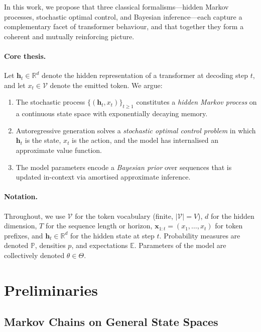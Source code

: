 \documentclass[11pt,a4paper]{article}
\theoremstyle{plain}
\theoremstyle{definition}
\theoremstyle{remark}
\newcommand{\R}{\mathbb{R}}
\newcommand{\E}{\mathbb{E}}
\newcommand{\Prob}{\mathbb{P}}
\newcommand{\vocab}{\mathcal{V}}
\begin{document}
In this work, we propose that three classical formalisms---hidden Markov
processes, stochastic optimal control, and Bayesian inference---each capture a
complementary facet of transformer behaviour, and that together they form a
coherent and mutually reinforcing picture.

\paragraph{Core thesis.}
Let $\bm{h}_t \in \R^d$ denote the hidden representation of a transformer at
decoding step $t$, and let $x_t \in \vocab$ denote the emitted token. We argue:
\begin{enumerate}[label=(\roman*)]
  \item The stochastic process $\{(\bm{h}_t, x_t)\}_{t \geq 1}$ constitutes a
        \emph{hidden Markov process} on a continuous state space with
        exponentially decaying memory.
  \item Autoregressive generation solves a \emph{stochastic optimal control
        problem} in which $\bm{h}_t$ is the state, $x_t$ is the action, and the
        model has internalised an approximate value function.
  \item The model parameters encode a \emph{Bayesian prior} over sequences that
        is updated in-context via amortised approximate inference.
\end{enumerate}

\paragraph{Notation.} Throughout, we use $\vocab$ for the token vocabulary
(finite, $|\vocab| = V$), $d$ for the hidden dimension, $T$ for the sequence
length or horizon, $\bm{x}_{1:t} = (x_1, \ldots, x_t)$ for token prefixes, and
$\bm{h}_t \in \R^d$ for the hidden state at step $t$. Probability measures are
denoted $\Prob$, densities $p$, and expectations $\E$. Parameters of the model
are collectively denoted $\theta \in \Theta$.

\section{Preliminaries}\label{sec:prelim}

\subsection{Markov Chains on General State Spaces}
\end{document}
